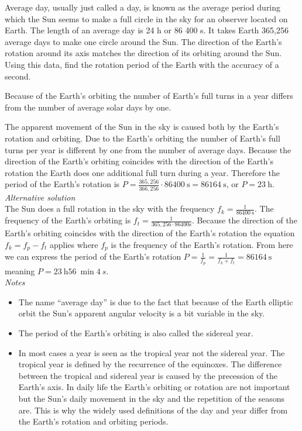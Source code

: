 Average day, usually just called a day, is known as the average period during which the Sun seems to make a full circle in the sky for an observer located on Earth. The length of an average day is 24 h or 86 400 s. It takes Earth 365,256 average days to make one circle around the Sun. The direction of the Earth’s rotation around its axis matches the direction of its orbiting around the Sun. Using this data, find the rotation period of the Earth with the accuracy of a second.

\hinteng
Because of the Earth’s orbiting the number of Earth’s full turns in a year differs from the number of average solar days by one.

\solueng
The apparent movement of the Sun in the sky is caused both by the Earth’s rotation and orbiting. Due to the Earth’s orbiting the number of Earth’s full turns per year is different by one from the number of average days. Because the direction of the Earth’s orbiting coincides with the direction of the Earth’s rotation the Earth does one additional full turn during a year. Therefore the period of the Earth’s rotation is $P=\frac{365,256}{366,256} \cdot \SI{86400}{\second}=\SI{86164}{\second}$, or $P=\SI{23}{\hour}$.\\

\emph{Alternative solution}\\
The Sun does a full rotation in the sky with the frequency $f_k=\frac{1}{\SI{86400}{\second}}$. The frequency of the Earth’s orbiting is $f_t=\frac{1}{365,256\cdot86400\text{s}}$. Because the direction of the Earth’s orbiting coincides with the direction of the Earth’s rotation the equation $f_k=f_p-f_t$ applies where $f_p$ is the frequency of the Earth’s rotation. From here we can express the period of the Earth’s rotation $P=\frac{1}{f_p}=\frac{1}{f_k+f_t}=\SI{86164}{\second}$ meaning $P=\SI{23}{\hour} \SI{56}{\min} \SI{4}{s}$. \\

\emph{Notes}\\
\begin{itemize}
\item The name “average day” is due to the fact that because of the Earth elliptic orbit the Sun’s apparent angular velocity is a bit variable in the sky.
\item The period of the Earth’s orbiting is also called the sidereal year.
\item In most cases a year is seen as the tropical year not the sidereal year. The tropical year is defined by the recurrence of the equinoxes. The difference between the tropical and sidereal year is caused by the precession of the Earth’s axis. In daily life the Earth’s orbiting or rotation are not important but the Sun’s daily movement in the sky and the repetition of the seasons are. This is why the widely used definitions of the day and year differ from the Earth’s rotation and orbiting periods.
\end{itemize}
\probend